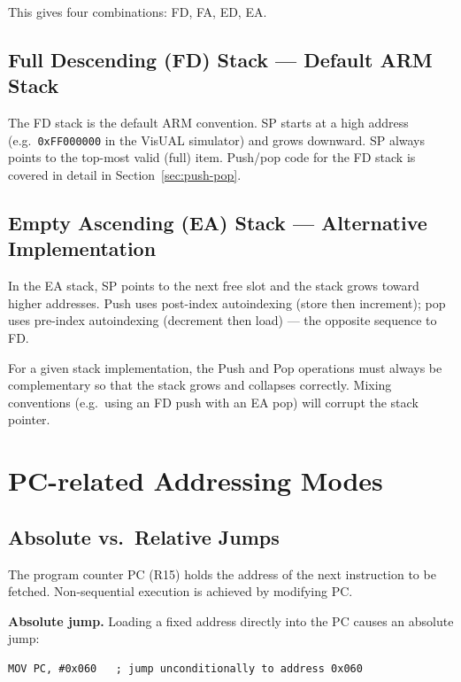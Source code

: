 \documentclass[11pt, a4paper, notitlepage]{report}
\theoremstyle{definition}
\theoremstyle{remark}
\theoremstyle{definition}
\begin{document}
This gives four combinations: FD, FA, ED, EA\@.

\subsection{Full Descending (FD) Stack --- Default ARM Stack}

The FD stack is the default ARM convention. SP starts at a high address (e.g.\ \texttt{0xFF000000} in the VisUAL simulator) and grows downward. SP always points to the top-most valid (full) item. Push/pop code for the FD stack is covered in detail in Section~\ref{sec:push-pop}.

\subsection{Empty Ascending (EA) Stack --- Alternative Implementation}

In the EA stack, SP points to the next free slot and the stack grows toward higher addresses. Push uses post-index autoindexing (store then increment); pop uses pre-index autoindexing (decrement then load) --- the opposite sequence to FD\@.

\begin{warning}[title={Push and Pop Must Be Complementary}]
For a given stack implementation, the Push and Pop operations must always be complementary so that the stack grows and collapses correctly. Mixing conventions (e.g.\ using an FD push with an EA pop) will corrupt the stack pointer.
\end{warning}

\section{PC-related Addressing Modes}

\subsection{Absolute vs.\ Relative Jumps}

The program counter PC (R15) holds the address of the next instruction to be fetched. Non-sequential execution is achieved by modifying PC\@.

\textbf{Absolute jump.} Loading a fixed address directly into the PC causes an absolute jump:

\begin{lstlisting}
MOV PC, #0x060   ; jump unconditionally to address 0x060
\end{lstlisting}
\end{document}
